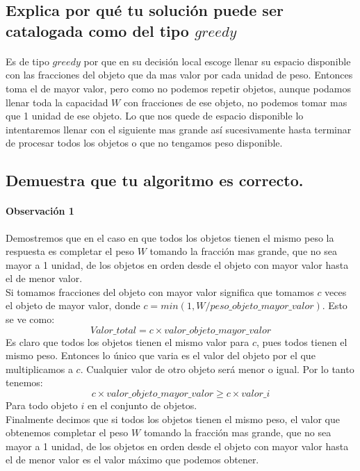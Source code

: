 \documentclass[12pt]{article}
\begin{document}
 \subsection{Explica por qué tu solución puede ser catalogada como del tipo $greedy$}
 \paragraph{} Es de tipo $greedy$ por que en su decisión local escoge llenar su espacio disponible con las fracciones del objeto que da mas valor por cada unidad de peso. Entonces toma el de mayor valor, pero como no podemos repetir objetos, aunque podamos llenar toda la capacidad $W$ con fracciones de ese objeto, no podemos tomar mas que 1 unidad de ese objeto. Lo que nos quede de espacio disponible lo intentaremos llenar con el siguiente mas grande así sucesivamente hasta terminar de procesar todos los objetos o que no tengamos peso disponible. 
 \subsection{Demuestra que tu algoritmo es correcto.}
 \paragraph{Observación 1} Demostremos que en el caso en que todos los objetos tienen el mismo peso la respuesta es completar el peso $W$ tomando la fracción mas grande, que no sea mayor a 1 unidad, de los objetos en orden desde el objeto con mayor valor hasta el de menor valor.\\
 Si tomamos fracciones del objeto con mayor valor significa que tomamos $c$ veces el objeto de mayor valor, donde $c= min(1,W/peso\_objeto\_mayor\_valor)$. Esto se ve como:\\
  \begin{equation}
Valor\_total = c \times valor\_objeto\_mayor\_valor
  \end{equation}
 Es claro que todos los objetos tienen el mismo valor para $c$, pues todos tienen el mismo peso. Entonces lo único que varia es el valor del objeto por el que multiplicamos a $c$. Cualquier valor de otro objeto será menor o igual. Por lo tanto tenemos:
   \begin{equation}
 c \times valor\_objeto\_mayor\_valor \geq c \times valor\_i
 \end{equation}
 Para todo objeto $i$ en el conjunto de objetos.\\
 Finalmente decimos que si todos los objetos tienen el mismo peso, el valor que obtenemos completar el peso $W$ tomando la fracción mas grande, que no sea mayor a 1 unidad, de los objetos en orden desde el objeto con mayor valor hasta el de menor valor es el valor máximo que podemos obtener.
\end{document}
